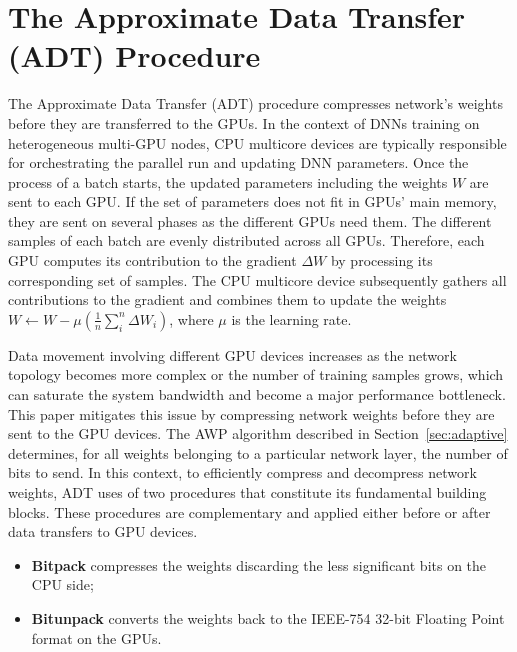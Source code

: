 \section{The Approximate Data Transfer (ADT) Procedure}
\label{sec:approx}

The Approximate Data Transfer (ADT) procedure compresses network's weights
before they are transferred to the GPUs.
In the context of DNNs training on heterogeneous multi-GPU nodes, CPU multicore devices 
are typically responsible for orchestrating the parallel run and updating DNN parameters.
Once the process of a batch starts, the updated parameters including the weights $W$ are sent to each GPU.
If the set of parameters does not fit in GPUs' main memory, they are sent on several phases as the different GPUs need them.
The different samples of each batch are evenly distributed across all GPUs.
Therefore, each GPU computes its contribution to the gradient $\Delta W$ by processing its corresponding set of samples.
The CPU multicore device subsequently gathers all contributions to the gradient and 
combines them to update the weights 
$W \gets W - \mu (\frac{1}{n} \sum_{i}^{n} \Delta W_{i})$, where $\mu$ is 
the learning rate.

Data movement involving different GPU devices increases as the network topology becomes more complex or the number of training samples grows, which can saturate the system bandwidth and become a major performance bottleneck.
This paper mitigates this issue by compressing network weights before they are sent to the GPU devices.
The AWP algorithm described in Section~\ref{sec:adaptive} determines, for all  
weights belonging to a particular network layer, the number of bits to send.
In this context, to efficiently compress and decompress network weights, ADT uses of two procedures that constitute its fundamental building blocks. 
These procedures are complementary and applied either before or after data transfers to GPU devices.
\begin{itemize}
    \item \textbf{Bitpack} compresses the weights discarding the less significant bits on the CPU side;
    \item \textbf{Bitunpack} converts the weights back to the IEEE-754 32-bit Floating Point format on the GPUs. 
\end{itemize}

